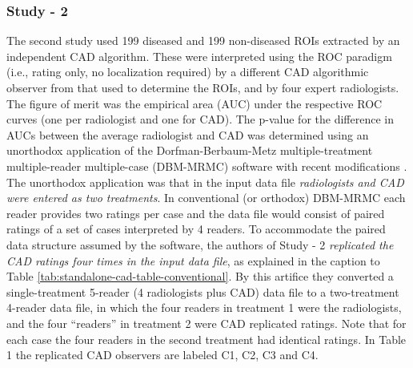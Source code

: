 \documentclass[
]{book}
\begin{document}
\hypertarget{standalone-cad-radiologists-study2}{%
\subsubsection{Study - 2}\label{standalone-cad-radiologists-study2}}

The second study \citep{kooi2016comparison} used 199 diseased and 199 non-diseased ROIs extracted by an independent CAD algorithm. These were interpreted using the ROC paradigm (i.e., rating only, no localization required) by a different CAD algorithmic observer from that used to determine the ROIs, and by four expert radiologists. The figure of merit was the empirical area (AUC) under the respective ROC curves (one per radiologist and one for CAD). The p-value for the difference in AUCs between the average radiologist and CAD was determined using an unorthodox application of the Dorfman-Berbaum-Metz \citep{dorfman1992receiver} multiple-treatment multiple-reader multiple-case (DBM-MRMC) software with recent modifications \citep{hillis2008recent}. The unorthodox application was that in the input data file \emph{radiologists and CAD were entered as two treatments}. In conventional (or orthodox) DBM-MRMC each reader provides two ratings per case and the data file would consist of paired ratings of a set of cases interpreted by 4 readers. To accommodate the paired data structure assumed by the software, the authors of Study - 2 \emph{replicated the CAD ratings four times in the input data file}, as explained in the caption to Table \ref{tab:standalone-cad-table-conventional}. By this artifice they converted a single-treatment 5-reader (4 radiologists plus CAD) data file to a two-treatment 4-reader data file, in which the four readers in treatment 1 were the radiologists, and the four ``readers'' in treatment 2 were CAD replicated ratings. Note that for each case the four readers in the second treatment had identical ratings. In Table 1 the replicated CAD observers are labeled C1, C2, C3 and C4.
\end{document}
